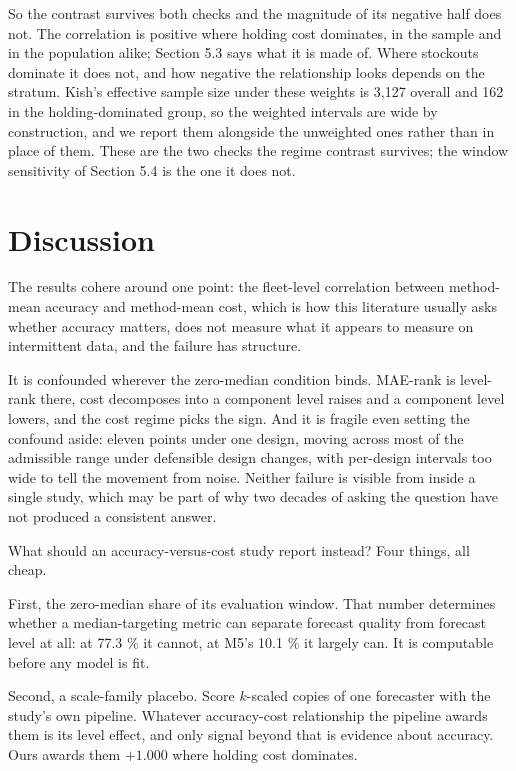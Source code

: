 \documentclass[11pt]{article}
\begin{document}
So the contrast survives both checks and the magnitude of its negative half
does not. The correlation is positive where holding cost dominates, in the
sample and in the population alike; Section 5.3 says what it is made of. Where stockouts dominate it does not, and how negative
the relationship looks depends on the stratum. Kish's effective sample size
under these weights is 3{,}127 overall
and 162 in the holding-dominated group, so the weighted intervals are wide by
construction, and we report them alongside the unweighted ones rather than in
place of them. These are the two checks the regime contrast survives; the
window sensitivity of Section 5.4 is the one it does not.

\section{Discussion}

The results cohere around one point: the fleet-level correlation between
method-mean accuracy and method-mean cost, which is how this literature
usually asks whether accuracy matters, does not measure what it appears to
measure on intermittent data, and the failure has structure.

It is confounded wherever the zero-median condition binds. MAE-rank is
level-rank there, cost decomposes into a component level raises and a
component level lowers, and the cost regime picks the sign. And it is fragile
even setting the confound aside: eleven points under one design, moving across
most of the admissible range under defensible design changes, with per-design
intervals too wide to tell the movement from noise. Neither failure
is visible from inside a single study, which may be part of why two decades of
asking the question have not produced a consistent answer.

What should an accuracy-versus-cost study report instead? Four things, all
cheap.

First, the zero-median share of its evaluation window. That number determines
whether a median-targeting metric can separate forecast quality from forecast
level at all: at 77.3 \% it cannot, at M5's 10.1 \% it largely can. It is
computable before any model is fit.

Second, a scale-family placebo. Score $k$-scaled copies of one forecaster with
the study's own pipeline. Whatever accuracy-cost relationship the pipeline
awards them is its level effect, and only signal beyond that is evidence about
accuracy. Ours awards them $+1.000$ where holding cost dominates.
\end{document}

